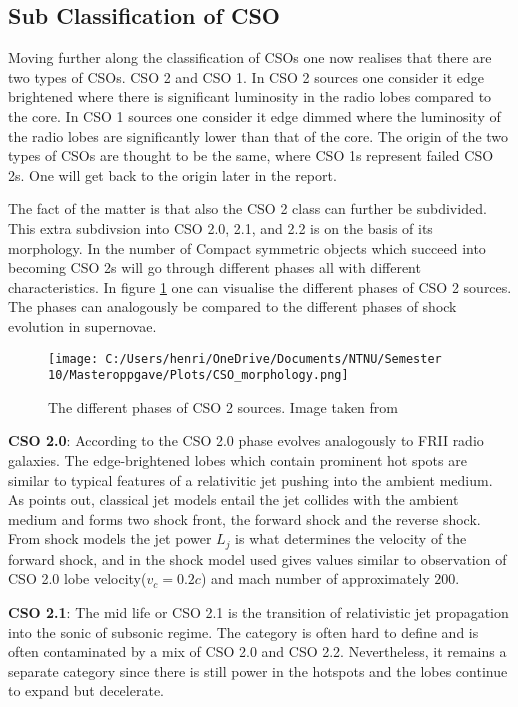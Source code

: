 \subsection{Sub Classification of CSO}
Moving further along the classification of CSOs one now realises that there are two types of CSOs. CSO 2 and CSO 1. In CSO 2 sources one consider it edge brightened where there is significant luminosity in the radio lobes compared to the core. In CSO 1 sources one consider it edge dimmed where the luminosity of the radio lobes are significantly lower than that of the core. The origin of the two types of CSOs are thought to be the same, where CSO 1s represent failed CSO 2s. One will get back to the origin later in the report.

The fact of the matter is that also the CSO 2 class can further be subdivided. This extra subdivsion into CSO 2.0, 2.1, and 2.2 is on the basis of its morphology. In the number of Compact symmetric objects which succeed into becoming CSO 2s will go through different phases all with different characteristics. In figure \ref{fig:CSO_2_morphology} one can visualise the different phases of CSO 2 sources. The phases can analogously be compared to the different phases of shock evolution in supernovae.

\begin{figure}
    \centering
    \texttt{[image: C:/Users/henri/OneDrive/Documents/NTNU/Semester 10/Masteroppgave/Plots/CSO\_morphology.png]}
    \caption{The different phases of CSO 2 sources. Image taken from \cite{sullivan2024smallscale}}
    \label{fig:CSO_2_morphology}
\end{figure}

\textbf{CSO 2.0}: According to \cite{sullivan2024smallscale} the CSO 2.0 phase evolves analogously to FRII radio galaxies. The edge-brightened lobes which contain prominent hot spots are similar to typical features of a relativitic jet pushing into the ambient medium. As \cite{sullivan2024smallscale} points out, classical jet models entail the jet collides with the ambient medium and forms two shock front, the forward shock and the reverse shock. From shock models the jet power $L_j$ is what determines the velocity of the forward shock, and in \cite{sullivan2024smallscale} the shock model used gives values similar to observation of CSO 2.0 lobe velocity($v_c = 0.2c$) and mach number of approximately $200$.

\textbf{CSO 2.1}: The mid life or CSO 2.1 is the transition of relativistic jet propagation into the sonic of subsonic regime. The category is often hard to define and is often contaminated by a  mix of CSO 2.0 and CSO 2.2. Nevertheless, it remains a separate category since there is still power in the hotspots and the lobes continue to expand but decelerate. 

